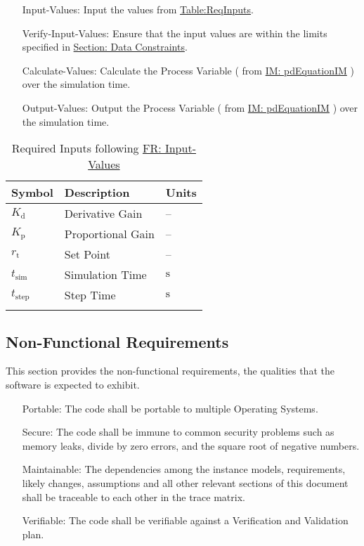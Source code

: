 \documentclass[12pt]{article}
\begin{document}
\begin{itemize}
\item[Input-Values:\phantomsection\label{inputValues}]{Input the values from \hyperref[Table:ReqInputs]{Table:ReqInputs}.}
\item[Verify-Input-Values:\phantomsection\label{verifyInputs}]{Ensure that the input values are within the limits specified in \hyperref[Sec:DataConstraints]{Section: Data Constraints}.}
\item[Calculate-Values:\phantomsection\label{calculateValues}]{Calculate the Process Variable ( from \hyperref[IM:pdEquationIM]{IM: pdEquationIM}  ) over  the simulation time.}
\item[Output-Values:\phantomsection\label{outputValues}]{Output the Process Variable ( from \hyperref[IM:pdEquationIM]{IM: pdEquationIM}  ) over  the simulation time.}
\end{itemize}
\begin{longtable}{l l l}
\toprule
\textbf{Symbol} & \textbf{Description} & \textbf{Units}
\\
\midrule
\endhead
${K_{\text{d}}}$ & Derivative Gain & --
\\
${K_{\text{p}}}$ & Proportional Gain & --
\\
${r_{\text{t}}}$ & Set Point & --
\\
${t_{\text{sim}}}$ & Simulation Time & ${\text{s}}$
\\
${t_{\text{step}}}$ & Step Time & ${\text{s}}$
\\
\bottomrule
\caption{Required Inputs following \hyperref[inputValues]{FR: Input-Values}}
\label{Table:ReqInputs}
\end{longtable}
\subsection{Non-Functional Requirements}
\label{Sec:NFRs}
This section provides the non-functional requirements, the qualities that the software is expected to exhibit.

\begin{itemize}
\item[Portable:\phantomsection\label{portability}]{The code shall be portable to multiple Operating Systems.}
\item[Secure:\phantomsection\label{security}]{The code shall be immune to common security problems such as memory leaks, divide by zero errors, and the square root of negative numbers.}
\item[Maintainable:\phantomsection\label{maintainability}]{The dependencies among the instance models, requirements, likely changes, assumptions and all other relevant sections of this document shall be traceable to each other in the trace matrix.}
\item[Verifiable:\phantomsection\label{verifiability}]{The code shall be verifiable against a Verification and Validation plan.}
\end{itemize}
\end{document}
